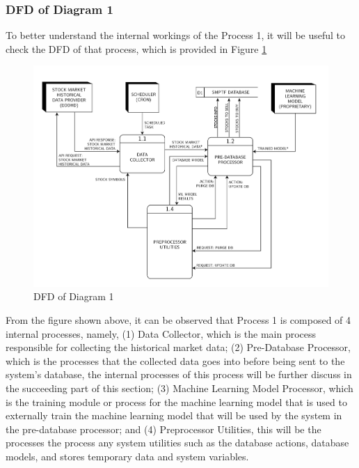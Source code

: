 \subsubsection{DFD of Diagram 1}
\label{subsubsec:dfd1}
To better understand the internal workings of the 
Process 1, it will be useful to check the DFD of that process, 
which is provided in Figure \ref{fig:dfd1}
\begin{figure}[ht]
    \centering
    \includegraphics[width=1\textwidth]{./assets/Data Flow Diagram-03.png}
    \caption{DFD of Diagram 1}
    \label{fig:dfd1}
\end{figure}
\FloatBarrier

From the figure shown above, it can be observed that Process 1 
is composed of 4 internal processes, namely, 
(1) Data Collector, which is the main process responsible 
for collecting the historical market data; 
(2) Pre-Database Processor, which is the processes that the collected 
data goes into before being sent to the system’s database, the 
internal processes of this process will be further discuss in the 
succeeding part of this section; 
(3) Machine Learning Model Processor, which is the training module or 
process for the machine learning model that is used to externally train 
the machine learning model that will be used by the system in the 
pre-database processor; and 
(4) Preprocessor Utilities, this will be the processes the process any 
system utilities such as the database actions, database models, and 
stores temporary data and system variables.

